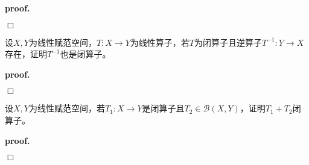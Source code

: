 \textbf{proof.}

$\Box$

\begin{mdframed}
    \begin{question}
        设$X,Y$为线性赋范空间，$T:X\rightarrow Y$为线性算子，若$T$为闭算子且逆算子$T^{-1}:Y\rightarrow X$存在，证明$T^{-1}$也是闭算子。
    \end{question}
\end{mdframed}

\textbf{proof.}

$\Box$

\begin{mdframed}
    \begin{question}
        设$X,Y$为线性赋范空间，若$T_1:X\rightarrow Y$是闭算子且$T_2\in \mathcal{B}(X,Y)$，证明$T_1+T_2$闭算子。
    \end{question}
\end{mdframed}

\textbf{proof.}

$\Box$